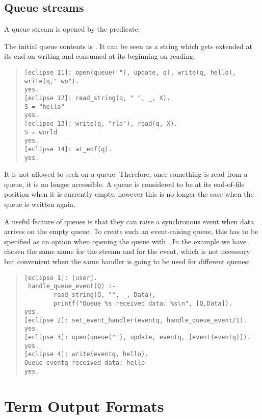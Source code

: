 \subsection{Queue streams}
\label{queueio}
A queue stream is opened by the
 predicate:
\begin{quote}
\end{quote}
The initial queue contents is .
It can be seen as a string which gets extended at its end on writing
and consumed at its beginning on reading.
\begin{quote}
\begin{verbatim}
[eclipse 11]: open(queue(""), update, q), write(q, hello), write(q," wo").
yes.
[eclipse 12]: read_string(q, " ", _, X).
S = "hello"
yes.
[eclipse 13]: write(q, "rld"), read(q, X).
S = world
yes.
[eclipse 14]: at_eof(q).
yes.
\end{verbatim}
\end{quote}
It is not allowed to seek on a queue. Therefore, once something is read
from a queue, it is no longer accessible. A queue is considered to be
at its end-of-file position when it is currently empty, however this
is no longer the case when the queue is written again.

A useful feature of queues is that they can raise a synchronous event
when data arrives on the empty queue. To create such an event-raising
queue, this has to be specified as an option when opening the queue with
.
In the example we have chosen the same name for the stream and for the
event, which is not necessary but convenient when the same handler
is going to be used for different queues:
\begin{quote}
\begin{verbatim}
[eclipse 1]: [user].
 handle_queue_event(Q) :-
        read_string(Q, "", _, Data),
        printf("Queue %s received data: %s\n", [Q,Data]).
yes.
[eclipse 2]: set_event_handler(eventq, handle_queue_event/1).
yes.
[eclipse 3]: open(queue(""), update, eventq, [event(eventq)]).
yes.
[eclipse 4]: write(eventq, hello).
Queue eventq received data: hello
yes.
\end{verbatim}
\end{quote}


\section{Term Output Formats}
\label{secoutputformats}

